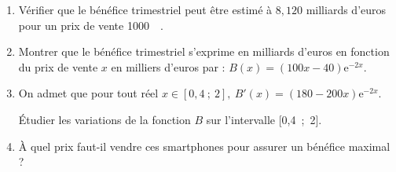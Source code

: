 \documentclass[10pt]{article}
\providecommand{\euro}{\texteuro}
\providecommand{\e}{{\mathrm{e}}}
\providecommand{\np}[2][]{{#2~#1}}
\providecommand{\euro}{{\text{€}}}
\renewcommand{\euro}{\ifmmode\text{\texteuro}\else\texteuro\fi}
\begin{document}
\begin{enumerate}[resume]
\item Vérifier que le bénéfice trimestriel peut être estimé à $8,120$ milliards d'euros pour un prix de vente \np{1000}~\euro.
\item Montrer que le bénéfice trimestriel s'exprime en milliards d'euros en fonction du prix de vente $x$ en milliers d'euros par : $B(x) = (100x - 40) \e^{-2x}.$
\item On admet que pour tout réel $x \in  [0,4~;~2],\: B'(x) = (180 - 200x )\e^{-2x}$.

 Étudier les variations de la fonction $B$ sur l'intervalle [0,4~;~2].
\item À quel prix faut-il vendre ces smartphones pour assurer un bénéfice maximal ?
\end{enumerate}
\end{document}
